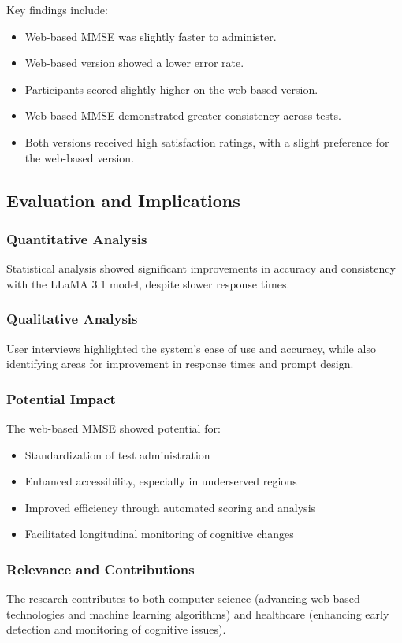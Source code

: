 Key findings include:
\begin{itemize}
    \item Web-based MMSE was slightly faster to administer.
    \item Web-based version showed a lower error rate.
    \item Participants scored slightly higher on the web-based version.
    \item Web-based MMSE demonstrated greater consistency across tests.
    \item Both versions received high satisfaction ratings, with a slight preference for the web-based version.
\end{itemize}

\subsection{Evaluation and Implications}

\subsubsection{Quantitative Analysis}
Statistical analysis showed significant improvements in accuracy and consistency with the LLaMA 3.1 model, despite slower response times.

\subsubsection{Qualitative Analysis}
User interviews highlighted the system's ease of use and accuracy, while also identifying areas for improvement in response times and prompt design.

\subsubsection{Potential Impact}
The web-based MMSE showed potential for:
\begin{itemize}
    \item Standardization of test administration
    \item Enhanced accessibility, especially in underserved regions
    \item Improved efficiency through automated scoring and analysis
    \item Facilitated longitudinal monitoring of cognitive changes
\end{itemize}

\subsubsection{Relevance and Contributions}
The research contributes to both computer science (advancing web-based technologies and machine learning algorithms) and healthcare (enhancing early detection and monitoring of cognitive issues).

